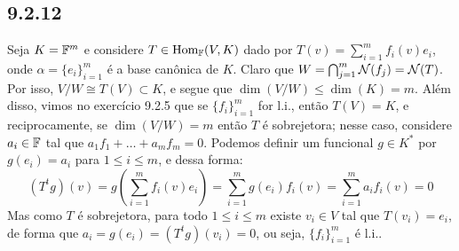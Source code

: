 \documentclass[../main.tex]{subfiles}
\begin{document}
    \subsection*{9.2.12}
    Seja $K=\mathbb{F}^m$ e considere \(T\in\text{Hom}_{\mathbb{F}}(V,K)\) dado por $T(v)=\sum_{i=1}^m f_i(v)e_i$, onde \(\alpha=\{e_i\}_{i=1}^m\) é a base canônica de $K$. Claro que $W=\bigcap_{j=1}^m\mathcal{N}(f_j)=\mathcal{N}(T)$. Por isso, $V/W\cong{T(V)}\subset K$, e segue que $\dim(V/W)\leq\dim(K)=m$. Além disso, vimos no exercício 9.2.5 que se $\{f_i\}_{i=1}^m$ for l.i., então $T(V)=K$, e reciprocamente, se $\dim(V/W)=m$ então $T$ é sobrejetora; nesse caso, considere \(a_i\in\mathbb{F}\) tal que $a_1f_1+\dots+a_mf_m=0$. Podemos definir um funcional $g\in K^*$ por $g(e_i)=a_i$ para $1\leq{i}\leq{m}$, e dessa forma:
    \[(T^tg)(v)=g\left(\sum_{i=1}^m f_i(v)e_i\right)=\sum_{i=1}^m g(e_i)f_i(v)=\sum_{i=1}^m a_if_i(v)=0\]
   Mas como $T$ é sobrejetora, para todo $1\leq i \leq m$ existe $v_i\in V$ tal que $T(v_i)=e_i$, de forma que $a_i=g(e_i)=(T^tg)(v_i)=0$, ou seja, $\{f_i\}_{i=1}^m$ é l.i..
\end{document}
